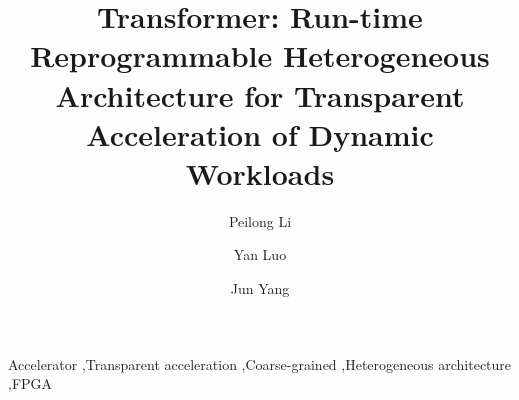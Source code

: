 \documentclass[3p,times]{elsarticle}
\begin{document}
\begin{frontmatter}

\title{Transformer: Run-time Reprogrammable Heterogeneous Architecture
  for Transparent Acceleration of Dynamic Workloads}


\author{Peilong Li}
\author{Yan Luo}
\address{University of Massachusetts Lowell, One University Ave, Lowell, MA, USA, 01854}
\author{Jun Yang}
\address{University of Pittsburgh, 4200 Fifth Avenue, Pittsburgh, PA, USA, 15260}



\begin{keyword}
Accelerator \sep Transparent acceleration \sep Coarse-grained
\sep Heterogeneous architecture \sep FPGA



\end{keyword}

\end{frontmatter}



















\end{document}
